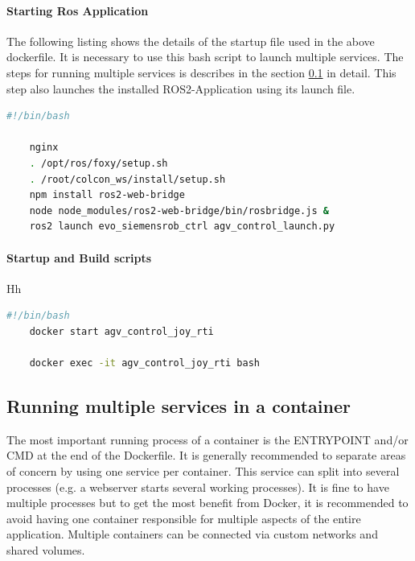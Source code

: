 \paragraph{Starting Ros Application} 
The following listing shows the details of the startup file used in the above dockerfile. It is necessary to use this bash script to launch multiple services. The steps for running multiple services is describes in the section \ref*{Implementation:Docker:Multiple Services} in detail.
This step also launches the installed ROS2-Application using its launch file.
\begin{lstlisting}[language=bash,
	caption={dockerfilestartup.sh}, 
	label={code:DockerTestumgebung}]
	#!/bin/bash

	nginx
	. /opt/ros/foxy/setup.sh
	. /root/colcon_ws/install/setup.sh
	npm install ros2-web-bridge
	node node_modules/ros2-web-bridge/bin/rosbridge.js &
	ros2 launch evo_siemensrob_ctrl agv_control_launch.py 
\end{lstlisting}

\paragraph{Startup and Build scripts} Hh


\begin{lstlisting}[language=bash,
	caption={runlifecycle.sh}, 
	label={code:DockerTestumgebung}]
	#!/bin/bash
	docker start agv_control_joy_rti

	docker exec -it agv_control_joy_rti bash 
\end{lstlisting}

\subsection{Running multiple services in a container}
\label{Implementation:Docker:Multiple Services}
The most important running process of a container is the ENTRYPOINT and/or CMD at the end of the Dockerfile. It is generally recommended to separate areas of concern by using one service per container. This service can split into several processes (e.g. a webserver starts several working processes). It is fine to have multiple processes but to get the most benefit from Docker, it is recommended to avoid having one container responsible for multiple aspects of the entire application. Multiple containers can be connected via custom networks and shared volumes.\\

